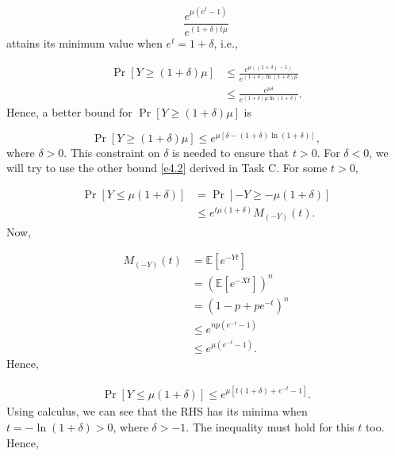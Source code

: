 \begin{equation*}
    \frac{e^{\mu(e^t-1)}}{e^{(1+\delta)t\mu}}
\end{equation*}
attains its minimum value when $e^t=1+\delta$, i.e.,

\begin{equation*}
    \begin{aligned}
        \Pr[Y\ge (1+\delta)\mu] &\le \frac{e^{\mu((1+\delta)-1)}}
        {e^{(1+\delta)\ln(1+\delta)\mu}} \\
        &\le \frac{e^{\mu\delta}}{e^{(1+\delta)\mu\ln(1+\delta)}}.
    \end{aligned}
\end{equation*}
Hence, a better bound for $\Pr[Y\ge (1+\delta)\mu]$ is

\begin{equation}
    \Pr[Y\ge (1+\delta)\mu] \le e^{\mu[\delta-(1+\delta)\ln(1+\delta)]},
    \label{e4.3}
\end{equation}
where $\delta>0$. This constraint on $\delta$ is needed to ensure that $t>0$. 
For $\delta<0$, we will try to use the other bound \ref{e4.2} derived in Task C.
For some $t>0$,

\begin{equation*}
    \begin{aligned}
        \Pr[Y\le \mu(1+\delta)] &= \Pr[-Y\ge -\mu(1+\delta)] \\
        &\le e^{t\mu(1+\delta)}M_{(-Y)}(t).
    \end{aligned}
\end{equation*}
Now,

\begin{equation*}
    \begin{aligned}
        M_{(-Y)}(t) &= \mathbb{E}[e^{-Yt}] \\
        &= \left(\mathbb{E}[e^{-Xt}]\right)^n \\
        &= (1-p+pe^{-t})^n \\
        &\le e^{np(e^{-t}-1)} \\
        &\le e^{\mu(e^{-t}-1)}.  
    \end{aligned}
\end{equation*}
Hence,

\begin{equation*}
    \begin{aligned}
        \Pr[Y\le\mu(1+\delta)] \le e^{\mu[t(1+\delta)+e^{-t}-1]}.
    \end{aligned}
\end{equation*}
Using calculus, we can see that the RHS has its minima when $t=-\ln(1+\delta)>0$,
where $\delta>-1$. The inequality must hold for this $t$ too. Hence,

